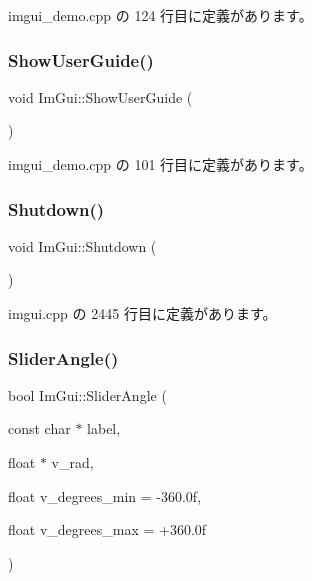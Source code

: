  imgui\+\_\+demo.\+cpp の 124 行目に定義があります。

\mbox{\label{namespace_im_gui_ad6f4919bc9aa806ca8d2c1d6e2bfb051}} 
\subsubsection{\texorpdfstring{Show\+User\+Guide()}{ShowUserGuide()}}
{\footnotesize\ttfamily void Im\+Gui\+::\+Show\+User\+Guide (\begin{DoxyParamCaption}{ }\end{DoxyParamCaption})}



 imgui\+\_\+demo.\+cpp の 101 行目に定義があります。

\mbox{\label{namespace_im_gui_aeba34069558d4fbcf734a9c92ce3b773}} 
\subsubsection{\texorpdfstring{Shutdown()}{Shutdown()}}
{\footnotesize\ttfamily void Im\+Gui\+::\+Shutdown (\begin{DoxyParamCaption}{ }\end{DoxyParamCaption})}



 imgui.\+cpp の 2445 行目に定義があります。

\mbox{\label{namespace_im_gui_ad20170a9fff4ded0076476dad8ec6645}} 
\subsubsection{\texorpdfstring{Slider\+Angle()}{SliderAngle()}}
{\footnotesize\ttfamily bool Im\+Gui\+::\+Slider\+Angle (\begin{DoxyParamCaption}\item[{const char $\ast$}]{label,  }\item[{float $\ast$}]{v\+\_\+rad,  }\item[{float}]{v\+\_\+degrees\+\_\+min = {\ttfamily -\/360.0f},  }\item[{float}]{v\+\_\+degrees\+\_\+max = {\ttfamily +360.0f} }\end{DoxyParamCaption})}



